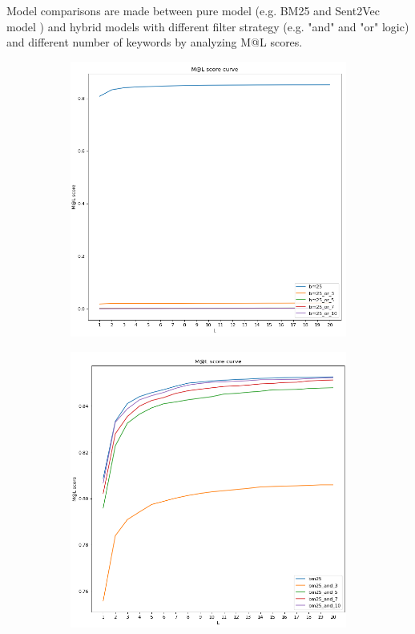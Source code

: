 \documentclass[10pt,a4paper,fleqn]{report}
\begin{document}
				Model comparisons are made between pure model (e.g. BM25 and Sent2Vec model ) and hybrid models with different filter strategy (e.g. "and" and "or" logic) and different number of keywords by analyzing M@L scores.
				
				\begin{figure}[htbp]
					\centering
					\begin{subfigure}[b]{0.48\textwidth}
						\centering
						\includegraphics[width=\textwidth]{figure/bm25_or.png}
						\caption{}
						\label{fig: hybrid_bm25_or}
					\end{subfigure}
					\hfill
					\begin{subfigure}[b]{0.48\textwidth}
						\centering
						\includegraphics[width=\textwidth]{figure/bm25_and.png}

\end{subfigure}
\end{figure}
\end{document}
